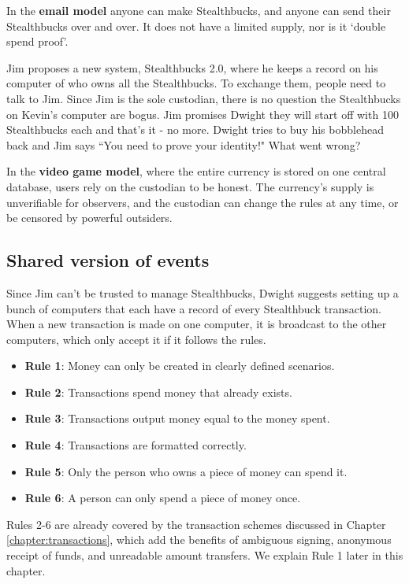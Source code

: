 In the \textbf{email model} anyone can make Stealthbucks, and anyone can send their Stealthbucks over and over. It does not have a limited supply, nor is it `double spend proof'.

Jim proposes a new system, Stealthbucks 2.0, where he keeps a record on his computer of who owns all the Stealthbucks. To exchange them, people need to talk to Jim. Since Jim is the sole custodian, there is no question the Stealthbucks on Kevin's computer are bogus. Jim promises Dwight they will start off with 100 Stealthbucks each and that's it - no more. Dwight tries to buy his bobblehead back and Jim says ``You need to prove your identity!" What went wrong?

In the \textbf{video game model}, where the entire currency is stored on one central database, users rely on the custodian to be honest. The currency's supply is unverifiable for observers, and the custodian can change the rules at any time, or be censored by powerful outsiders.


\subsection{Shared version of events}
\label{subsec:shared-version-events}

Since Jim can't be trusted to manage Stealthbucks, Dwight suggests setting up a bunch of computers that each have a record of every Stealthbuck transaction. When a new transaction is made on one computer, it is broadcast to the other computers, which only accept it if it follows the rules.

\begin{itemize}
    \item[] \textbf{Rule 1}: Money can only be created in clearly defined scenarios.
    \item[] \textbf{Rule 2}: Transactions spend money that already exists.
    \item[] \textbf{Rule 3}: Transactions output money equal to the money spent.
    \item[] \textbf{Rule 4}: Transactions are formatted correctly.
    \item[] \textbf{Rule 5}: Only the person who owns a piece of money can spend it.
    \item[] \textbf{Rule 6}: A person can only spend a piece of money once.
\end{itemize}

Rules 2-6 are already covered by the transaction schemes discussed in Chapter \ref{chapter:transactions}, which add the benefits of ambiguous signing, anonymous receipt of funds, and unreadable amount transfers. We explain Rule 1 later in this chapter.

